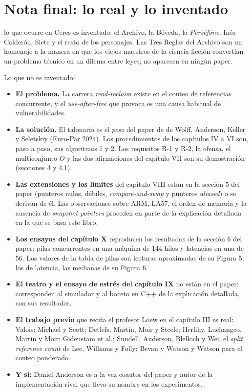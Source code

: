 \chapter{Nota final: lo real y lo inventado}

 lo que ocurre en Ceres es inventado: el Archivo, la Bóveda, la \emph{Perséfone}, Inés Calderón, Siete y el resto de los personajes. Las Tres Reglas del Archivo son un homenaje a la manera en que los viejos maestros de la ciencia ficción convertían un problema técnico en un dilema entre leyes; no aparecen en ningún paper.

Lo que no es inventado:

\begin{itemize}
\item \textbf{El problema.} La carrera \emph{read-reclaim} existe en el conteo de referencias concurrente, y el \emph{use-after-free} que provoca es una causa habitual de vulnerabilidades.
\item \textbf{La solución.} El talonario es el \emph{peso} del paper de de Wolff, Anderson, Keller y Seletskiy (Euro-Par 2024). Los procedimientos de los capítulos IV a VI son, paso a paso, sus algoritmos 1 y 2. Los requisitos R-1 y R-2, la ofensa, el multiconjunto $O$ y las dos afirmaciones del capítulo VII son su demostración (secciones 4 y 4.1).
\item \textbf{Las extensiones y los límites} del capítulo VIII están en la sección 5 del paper (punteros nulos, débiles, \emph{compare-and-swap} y punteros \emph{aliased}) o se derivan de él. Las observaciones sobre ARM, LA57, el orden de memoria y la ausencia de \emph{snapshot pointers} proceden en parte de la explicación detallada en la que se basa este libro.
\item \textbf{Los ensayos del capítulo X} reproducen los resultados de la sección 6 del paper: pilas concurrentes en una máquina de 144 hilos y latencias en una de 56. Los valores de la tabla de pilas son lecturas aproximadas de su Figura 5; los de latencia, las medianas de su Figura 6.
\item \textbf{El teatro y el ensayo de estrés del capítulo IX} no están en el paper: corresponden al simulador y al boceto en C++ de la explicación detallada, con sus resultados.
\item \textbf{El trabajo previo} que recita el profesor Loew en el capítulo III es real: Valois; Michael y Scott; Detlefs, Martin, Moir y Steele; Herlihy, Luchangco, Martin y Moir; Gidenstam et al.; Sundell; Anderson, Blelloch y Wei; el \emph{split reference count} de Lee, Williams y Folly; Bevan y Watson y Watson para el conteo ponderado.
\item \textbf{Y sí:} Daniel Anderson es a la vez coautor del paper y autor de la implementación rival que lleva su nombre en los experimentos.
\end{itemize}

